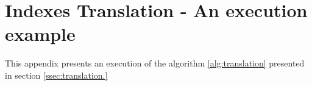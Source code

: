 \appendix
\chapter{Indexes Translation - An execution example}

This appendix presents an execution of the algorithm \ref{alg:translation} presented in section \ref{ssec:translation.}